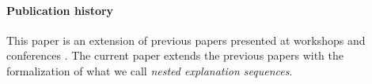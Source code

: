 \paragraph*{Publication history} This paper is an extension of previous papers presented at workshops and conferences \cite{claesuser,DBLP:conf/bnaic/ClaesBCGG19,ecai/BogaertsGCG20}. The current paper extends the previous papers with the formalization of what we call \emph{nested explanation sequences}.
